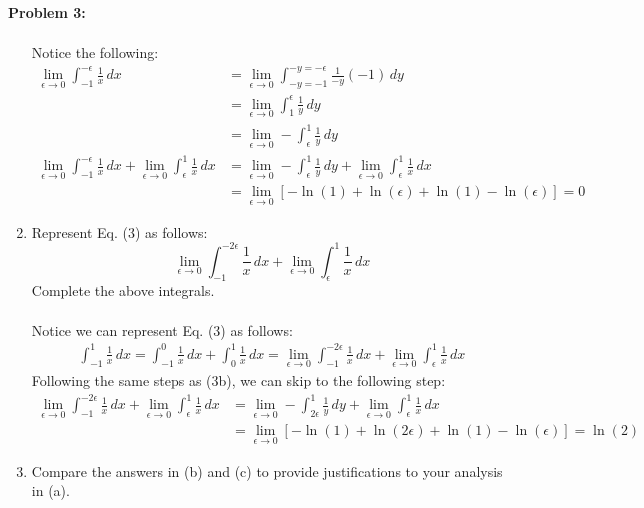 \documentclass[11pt]{article}
\newenvironment{problem}[1]{\textbf{Problem #1: }}{\newpage}
\begin{document}
\begin{problem}{3}
\begin{enumerate}[label = (\alph*)]
\begin{align*}
				\end{align*}
			Notice the following:
				\begin{align*}
					\lim\limits_{\epsilon \rightarrow 0} \int_{-1}^{-\epsilon} \frac{1}{x}\,dx &= \lim\limits_{\epsilon \rightarrow 0} \int_{-y = -1}^{-y = -\epsilon} \frac{1}{-y}(-1)\,dy \tag{Subsitute $x = -y$}\\
					&= \lim\limits_{\epsilon \rightarrow 0} \int_{1}^{\epsilon} \frac{1}{y}\,dy \\
					&= \lim\limits_{\epsilon \rightarrow 0} -\int_{\epsilon}^{1} \frac{1}{y}\,dy \\
					\lim\limits_{\epsilon \rightarrow 0} \int_{-1}^{-\epsilon} \frac{1}{x}\,dx + \lim\limits_{\epsilon \rightarrow 0} \int_{\epsilon}^{1} \frac{1}{x}\,dx &= \lim\limits_{\epsilon \rightarrow 0} -\int_{\epsilon}^{1} \frac{1}{y}\,dy + \lim\limits_{\epsilon \rightarrow 0} \int_{\epsilon}^{1} \frac{1}{x}\,dx  \\
					&= \lim\limits_{\epsilon \rightarrow 0} \left[- \ln(1) + \ln(\epsilon) + \ln(1) - \ln(\epsilon)\right] = 0
				\end{align*}
			\item Represent Eq. (3) as follows:
			$$\lim\limits_{\epsilon \rightarrow 0} \int_{-1}^{-2\epsilon} \frac{1}{x}\,dx + \lim\limits_{\epsilon \rightarrow 0} \int_{\epsilon}^{1} \frac{1}{x}\,dx$$
			Complete the above integrals.
			\\ \\
			Notice we can represent Eq. (3) as follows:
				\begin{align*}
					\int_{-1}^{1} \frac{1}{x} \, dx = \int_{-1}^{0} \frac{1}{x}\,dx + \int_{0}^{1} \frac{1}{x}\,dx = \lim\limits_{\epsilon \rightarrow 0} \int_{-1}^{-2\epsilon} \frac{1}{x}\,dx + \lim\limits_{\epsilon \rightarrow 0} \int_{\epsilon}^{1} \frac{1}{x}\,dx
				\end{align*}
			Following the same steps as (3b), we can skip to the following step:
				\begin{align*}
					\lim\limits_{\epsilon \rightarrow 0} \int_{-1}^{-2\epsilon} \frac{1}{x}\,dx + \lim\limits_{\epsilon \rightarrow 0} \int_{\epsilon}^{1} \frac{1}{x}\,dx &= \lim\limits_{\epsilon \rightarrow 0} -\int_{2\epsilon}^{1} \frac{1}{y}\,dy + \lim\limits_{\epsilon \rightarrow 0} \int_{\epsilon}^{1} \frac{1}{x}\,dx  \\
					&= \lim\limits_{\epsilon \rightarrow 0} \left[ - \ln(1) + \ln(2\epsilon) + \ln(1) - \ln(\epsilon) \right] = \ln(2)
				\end{align*}
			\item Compare the answers in (b) and (c) to provide justifications to your analysis in (a).

\end{enumerate}
\end{problem}
\end{document}
